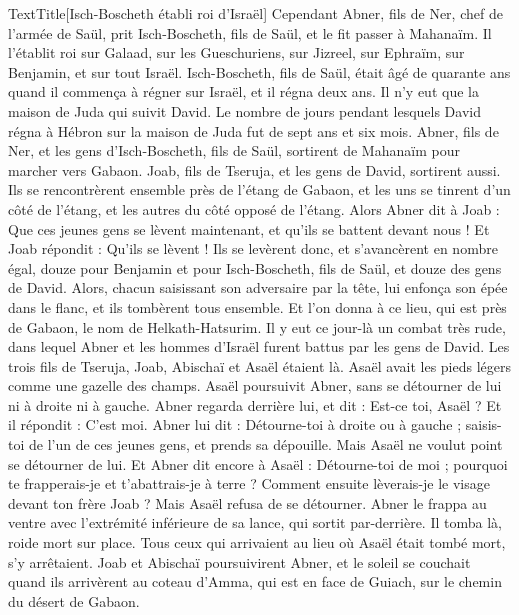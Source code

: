 \begin{multicols}{2}
TextTitle{[Isch-Boscheth établi roi d'Israël]}
Cependant Abner, fils de Ner, chef de l'armée de Saül, prit Isch-Boscheth, fils de Saül, et le fit passer à Mahanaïm.
Il l'établit roi sur Galaad, sur les Gueschuriens, sur Jizreel, sur Ephraïm, sur Benjamin, et sur tout Israël.
Isch-Boscheth, fils de Saül, était âgé de quarante ans quand il commença à régner sur Israël, et il régna deux ans. Il n'y eut que la maison de Juda qui suivit David.
Le nombre de jours pendant lesquels David régna à Hébron sur la maison de Juda fut de sept ans et six mois.
Abner, fils de Ner, et les gens d'Isch-Boscheth, fils de Saül, sortirent de Mahanaïm pour marcher vers Gabaon.
Joab, fils de Tseruja, et les gens de David, sortirent aussi. Ils se rencontrèrent ensemble près de l'étang de Gabaon, et les uns se tinrent d’un côté de l'étang, et les autres du côté opposé de l’étang.
Alors Abner dit à Joab : Que ces jeunes gens se lèvent maintenant, et qu'ils se battent devant nous ! Et Joab répondit : Qu'ils se lèvent !
Ils se levèrent donc, et s’avancèrent en nombre égal, douze pour Benjamin et pour Isch-Boscheth, fils de Saül, et douze des gens de David.
Alors, chacun saisissant son adversaire par la tête, lui enfonça son épée dans le flanc, et ils tombèrent tous ensemble. Et l'on donna à ce lieu, qui est près de Gabaon, le nom de Helkath-Hatsurim.
Il y eut ce jour-là un combat très rude, dans lequel Abner et les hommes d’Israël furent battus par les gens de David.
Les trois fils de Tseruja, Joab, Abischaï et Asaël étaient là. Asaël avait les pieds légers comme une gazelle des champs.
Asaël poursuivit Abner, sans se détourner de lui ni à droite ni à gauche.
Abner regarda derrière lui, et dit : Est-ce toi, Asaël ? Et il répondit : C’est moi.
Abner lui dit : Détourne-toi à droite ou à gauche ; saisis-toi de l'un de ces jeunes gens, et prends sa dépouille. Mais Asaël ne voulut point se détourner de lui.
Et Abner dit encore à Asaël : Détourne-toi de moi ; pourquoi te frapperais-je et t'abattrais-je à terre ? Comment ensuite lèverais-je le visage devant ton frère Joab ?
Mais Asaël refusa de se détourner. Abner le frappa au ventre avec l'extrémité inférieure de sa lance, qui sortit par-derrière. Il tomba là, roide mort sur place. Tous ceux qui arrivaient au lieu où Asaël était tombé mort, s'y arrêtaient.
Joab et Abischaï poursuivirent Abner, et le soleil se couchait quand ils arrivèrent au coteau d'Amma, qui est en face de Guiach, sur le chemin du désert de Gabaon.

\end{multicols}
